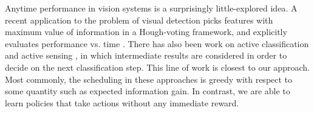 Anytime performance in vision systems is a surprisingly little-explored idea.
A recent application to the problem of visual detection picks features with maximum value of information in a Hough-voting framework, and explicitly evaluates performance vs. time \cite{Vijayanarasimhan2010}. 
There has also been work on active classification \cite{Gao2011} and active sensing \cite{Yu2009}, in which intermediate results are considered in order to decide on the next classification step.
This line of work is closest to our approach.
Most commonly, the scheduling in these approaches is greedy with respect to some quantity such as expected information gain.
In contrast, we are able to learn policies that take actions without any immediate reward.
